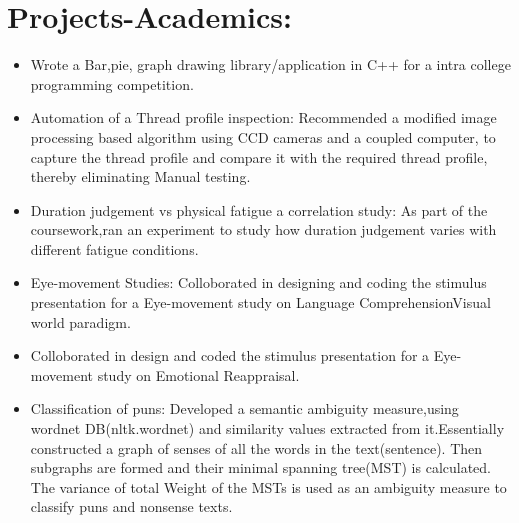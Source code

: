 \section {Projects-Academics:}

	\begin{itemize}
		\item Wrote a Bar,pie, graph drawing library/application in C++ for a intra college programming competition.

		\item Automation of a Thread profile inspection: Recommended a modified image processing based algorithm using CCD cameras and a coupled computer, to capture the thread profile and compare it with the required thread profile, thereby eliminating Manual testing.

	 	\item Duration judgement vs physical fatigue a correlation study: As part of the coursework,ran an experiment to study how duration judgement varies with different fatigue conditions.

		\item Eye-movement Studies: Colloborated in designing and coding the stimulus presentation for a Eye-movement study on Language ComprehensionVisual world paradigm.

		\item Colloborated in design and coded the stimulus presentation for a Eye-movement study on Emotional Reappraisal.

		\item Classification of puns: Developed a semantic ambiguity measure,using wordnet DB(nltk.wordnet) and similarity values extracted from it.Essentially constructed a graph of senses of all the words in the text(sentence). Then subgraphs are formed and their minimal spanning tree(MST) is calculated. The variance of total Weight of the MSTs is used as an ambiguity measure to classify puns and nonsense texts.
	\end{itemize}
